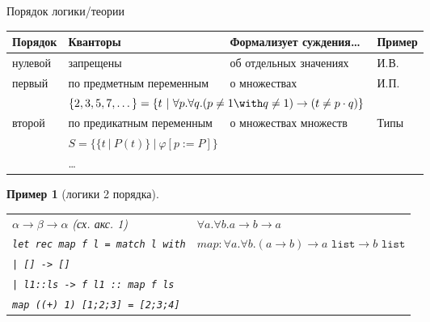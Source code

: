 \documentclass[aspectratio=169]{beamer}
\newtheorem{exm}{Пример}[section]
\begin{document}
\begin{frame}{Порядок логики/теории}
\begin{tabular}{llll}
Порядок & Кванторы & Формализует суждения\dots & Пример\\\hline
нулевой & запрещены & об отдельных значениях & И.В.\\
первый & по предметным переменным & о множествах & И.П.\\
    &   \multicolumn{2}{l}{\color{olive}$\{2,3,5,7,\dots\} = \{ t\ |\ \forall p.\forall q.(p \ne 1 \with q \ne 1) \rightarrow (t \ne p\cdot q)\}$}\\
второй & по предикатным переменным & о множествах множеств & Типы\\
    &   \multicolumn{2}{l}{\color{olive}$S = \{ \{t\ |\ P(t)\}\ |\ \varphi[p := P] \}$}\\
 & \dots 
\end{tabular}
\pause\vspace{0.3cm}

\begin{exm}[логики 2 порядка]\upshape
\begin{tabular}{ll}
$\alpha\rightarrow\beta\rightarrow\alpha$ (сх. акс. 1) & $\forall a.\forall b.a \rightarrow b \rightarrow a$ \vspace{0.1cm}\\
\texttt{let rec map f l = match l with} & $map: \forall a.\forall b.(a \rightarrow b) \rightarrow a\texttt{ list} \rightarrow b\texttt{ list}$ \\
\texttt{| [] -> []} \\
\texttt{| l1::ls -> f l1 :: map f ls}\vspace{0.1cm}\\
\texttt{map ((+) 1) [1;2;3] = [2;3;4]}
\end{tabular}
\end{exm}

\end{frame}
\end{document}
